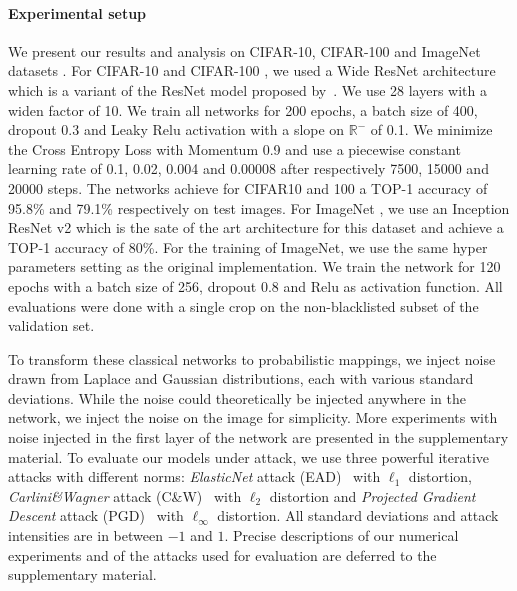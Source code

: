 \paragraph{Experimental setup}

We present our results and analysis on  CIFAR-10, CIFAR-100 \cite{krizhevsky2009learning} and ImageNet datasets \cite{deng2009imagenet}.
For CIFAR-10 and CIFAR-100 \cite{krizhevsky2009learning}, we used a Wide ResNet architecture \cite{zagoruyko2016wide} which is a variant of the ResNet model proposed by~\citet{he2016deep}.
We use 28 layers with a widen factor of 10.
We train all networks for 200 epochs, a batch size of 400, dropout 0.3 and Leaky Relu activation with a slope on $\mathbb{R}^-$ of 0.1.
We minimize the Cross Entropy Loss with Momentum 0.9 and use a piecewise constant learning rate of 0.1, 0.02, 0.004 and 0.00008 after respectively 7500, 15000 and 20000 steps.
The networks achieve for CIFAR10 and 100 a TOP-1 accuracy of 95.8\% and 79.1\% respectively on test images.
For ImageNet \cite{deng2009imagenet}, we use an Inception ResNet v2 \cite{szegedy2017inception} which is the sate of the art architecture for this dataset and achieve a TOP-1 accuracy of 80\%.
For the training of ImageNet, we use the same hyper parameters setting as the original implementation.
We train the network for 120 epochs with a batch size of 256, dropout 0.8 and Relu as activation function.
All evaluations were done with a single crop on the non-blacklisted subset of the validation set.

To transform these classical networks to probabilistic mappings, we inject noise drawn from Laplace and Gaussian distributions, each with various standard deviations.
While the noise could theoretically be injected anywhere in the network, we inject the noise on the image for simplicity.
More experiments with noise injected in the first layer of the network are presented in the supplementary material.
To evaluate our models under attack, we use three powerful iterative attacks with different norms: \emph{ElasticNet} attack (EAD)~\cite{chen2018ead} with $\ell_1$ distortion, \emph{Carlini\&Wagner} attack (C\&W)~\cite{carlini2017towards} with $\ell_2$ distortion and \emph{Projected Gradient Descent} attack (PGD)~\cite{madry2018towards} with $\ell_\infty$ distortion.
All standard deviations and attack intensities are in between $-1$ and $1$.
Precise descriptions of our numerical experiments and of the attacks used for evaluation are deferred to the supplementary material.

